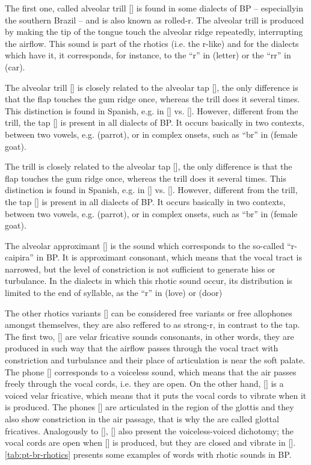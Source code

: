 The first one, called alveolar trill [] is found in some dialects of \ac{BP} -- especiallyin  the southern Brazil -- and is also known as rolled-r. The alveolar trill is produced by making the tip of the tongue touch the alveolar ridge repeatedly, interrupting the airflow. This sound is part of the rhotics (i.e. the r-like) and for the dialects which have it, it corresponds, for instance, to the ``r'' in  (letter) or the ``rr'' in  (car).

The alveolar trill [] is closely related to the alveolar tap [], the only difference is that the flap touches the gum ridge once, whereas the trill does it several times. This distinction is found in Spanish, e.g. in  [] vs.  []. However, different from the trill, the tap [] is present in all dialects of \ac{BP}. It occurs basically in two contexts, between two vowels, e.g.  (parrot), or in complex onsets, such as ``br'' in  (female goat).

The trill is closely related to the alveolar tap [], the only difference is that the flap touches the gum ridge once, whereas the trill does it several times. This distinction is found in Spanish, e.g. in  [] vs.  []. However, different from the trill, the tap [] is present in all dialects of \ac{BP}. It occurs basically in two contexts, between two vowels, e.g.  (parrot), or in complex onsets, such as ``br'' in  (female goat).

The alveolar approximant [] is the sound which corresponds to the so-called ``r-caipira'' in \ac{BP}. It is approximant consonant, which means that the vocal tract is narrowed, but the level of constriction is not sufficient to generate hiss or turbulance. In the dialects in which this rhotic sound occur, its distribution is limited to the end of syllable, as the ``r'' in  (love) or  (door)

The other rhotics variants [] can be considered free variants or free allophones amongst themselves, they are also reffered to as strong-r, in contrast to the tap. The first two, [] are velar fricative sounds consonants, in other words, they are produced in such way that the airflow passes through the vocal tract with constriction and turbulance and their place of articulation is near the soft palate. The phone [] corresponds to a voiceless sound, which means that the air passes freely through the vocal cords, i.e. they are open. On the other hand, [] is a voiced velar fricative, which means that it puts the vocal cords to vibrate when it is produced. The phones [] are articulated in the region of the glottis and they also show constriction in the air passage, that is why the are called glottal fricatives. Analogously to [], [] also present the voiceless-voiced dichotomy; the vocal cords are open when [] is produced, but they are closed and vibrate in []. \autoref{tab:pt-br-rhotics} presents some examples of words with rhotic sounds in \ac{BP}.

